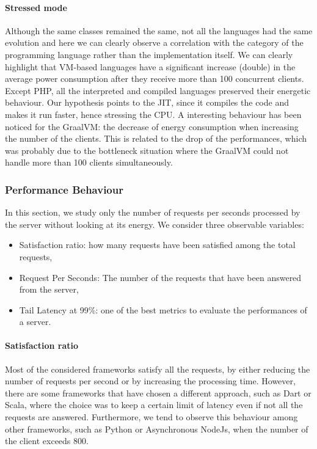 \paragraph{Stressed mode}
Although the same classes remained the same, not all the languages had the same evolution and here we can clearly observe a correlation with the category of the programming language rather than the implementation itself.
We can clearly highlight that VM-based languages have a significant increase (double) in the average power consumption after they receive more than 100 concurrent clients.
Except PHP, all the interpreted and compiled languages preserved their energetic behaviour.
Our hypothesis points to the JIT, since it compiles the code and makes it run faster, hence stressing the CPU.
A interesting behaviour has been noticed for the GraalVM: the decrease of energy consumption when increasing the number of the clients.
This is related to the drop of the performances, which was probably due to the bottleneck situation where the GraalVM could not handle more than 100 clients simultaneously.

\subsubsection{Performance Behaviour}
In this section, we study only the number of requests per seconds processed by the server without looking at its energy.
We consider three observable variables:
\begin{itemize}
    \item \textsf{Satisfaction ratio}: how many requests have been satisfied among the total requests,
    \item \textsf{Request Per Seconds}: The number of the requests that have been answered from the server,
    \item \textsf{Tail Latency at 99\%}: one of the best metrics to evaluate the performances of a server.
\end{itemize}

\paragraph{Satisfaction ratio}
Most of the considered frameworks satisfy all the requests, by either reducing the number of requests per second or by increasing the processing time.
However, there are some frameworks that have chosen a different approach, such as Dart or Scala, where the choice was to keep a certain limit of latency even if not all the requests are answered.
Furthermore, we tend to observe this behaviour among other frameworks, such as Python or Asynchronous NodeJs, when the number of the client exceeds 800.


